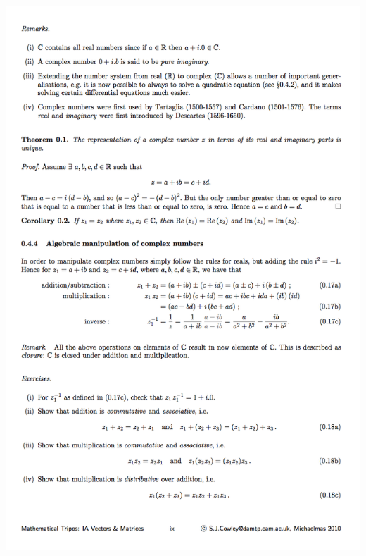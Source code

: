 \begin{mdframed}
  \includegraphics[width=400pt]{img/misc--cambridge-1a-vectors-and-matrices-revision-3.png}
\end{mdframed}